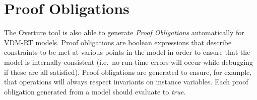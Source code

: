 
%

\section{Proof Obligations}\label{sec:PO}

The Overture tool is also able to generate \emph{Proof Obligations}
automatically for VDM-RT models. Proof obligations are boolean
expressions that describe constraints to be met at various points in
the model in order to ensure that the model is internally consistent
(i.e.\ no run-time errors will occur while debugging if these are all
satisfied). Proof obligations are generated to ensure, for example,
that operations will always respect invariants on instance
variables. Each proof obligation generated from a model should
evaluate to \emph{true}.

